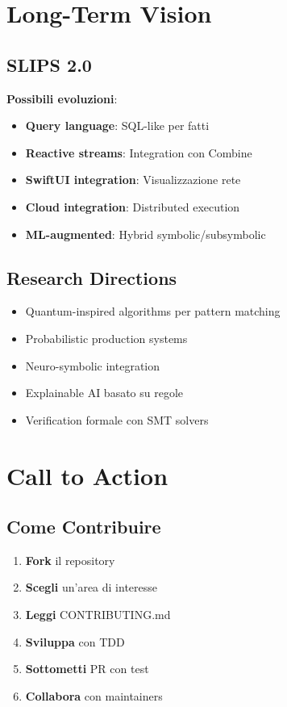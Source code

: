 \section{Long-Term Vision}

\subsection{SLIPS 2.0}

\textbf{Possibili evoluzioni}:

\begin{itemize}
\item \textbf{Query language}: SQL-like per fatti
\item \textbf{Reactive streams}: Integration con Combine
\item \textbf{SwiftUI integration}: Visualizzazione rete
\item \textbf{Cloud integration}: Distributed execution
\item \textbf{ML-augmented}: Hybrid symbolic/subsymbolic
\end{itemize}

\subsection{Research Directions}

\begin{itemize}
\item Quantum-inspired algorithms per pattern matching
\item Probabilistic production systems
\item Neuro-symbolic integration
\item Explainable AI basato su regole
\item Verification formale con SMT solvers
\end{itemize}

\section{Call to Action}

\subsection{Come Contribuire}

\begin{enumerate}
\item \textbf{Fork} il repository
\item \textbf{Scegli} un'area di interesse
\item \textbf{Leggi} CONTRIBUTING.md
\item \textbf{Sviluppa} con TDD
\item \textbf{Sottometti} PR con test
\item \textbf{Collabora} con maintainers
\end{enumerate}

